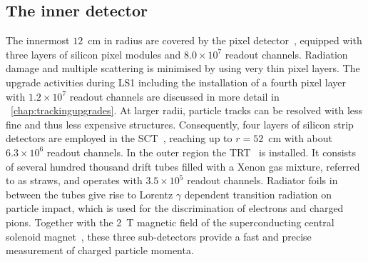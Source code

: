\subsection{The inner detector}
%
The innermost $12$~cm in radius are covered by the pixel detector~\cite{pixeltdr}, equipped with three layers of silicon pixel modules and $8.0\times10^7$ readout channels. Radiation damage and multiple scattering is minimised by using very thin pixel layers. The upgrade activities during \gls{LS1} including the installation of a fourth pixel layer with $1.2\times10^7$ readout channels are discussed in more detail in \chap~\ref{chap:trackingupgrades}. 
%
At larger radii, particle tracks can be resolved with less fine and thus less expensive structures. Consequently, four layers of silicon strip detectors are employed in the \gls{SCT}~\cite{sctpaper}, reaching up to $r=52$~cm with about $6.3\times10^6$ readout channels. 
In the outer region the \gls{TRT}~\cite{trt} is installed. It consists of several hundred thousand drift tubes filled with a Xenon gas mixture, referred to as straws, and operates with $3.5\times10^5$ readout channels. 
Radiator foils in between the tubes give rise to Lorentz $\gamma$ dependent transition radiation on particle impact, which is used for the discrimination of electrons and charged pions. 
%
Together with the 2~T magnetic field of the superconducting central solenoid magnet~\cite{Magnet1}, these three sub-detectors provide a fast and precise measurement of charged particle momenta.
%






